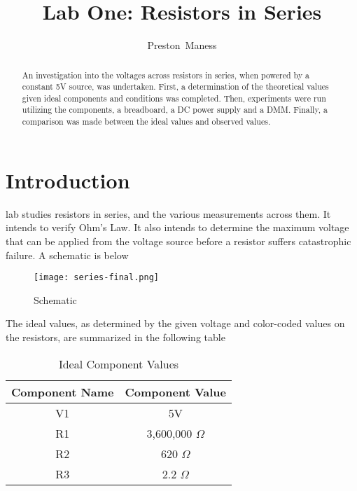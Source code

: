 \documentclass[journal]{IEEEtran}
\begin{document}
\title{Lab One: Resistors in Series}
\author{Preston~Maness}

%
{}

\maketitle

\begin{abstract}
An investigation into the voltages across resistors in series, when powered by a constant 5V source, was undertaken. First, a determination of the theoretical values given ideal components and conditions was completed. Then, experiments were run utilizing the components, a breadboard, a DC power supply and a DMM. Finally, a comparison was made between the ideal values and observed values.
\end{abstract}

\section{Introduction}
 lab studies resistors in series, and the various measurements across them. It intends to verify Ohm's Law. It also intends to determine the maximum voltage that can be applied from the voltage source before a resistor suffers catastrophic failure. A schematic is below

\begin{figure}[h!]
\centering
\texttt{[image: series-final.png]}
\caption{Schematic}
\label{fig_schem}
\end{figure}

The ideal values, as determined by the given voltage and color-coded values on the resistors, are summarized in the following table

\begin{table}[h!]
\renewcommand{\arraystretch}{1.5}
\caption{Ideal Component Values}
\label{table_ideal}
\centering
\begin{tabular}{|c|c|}
\hline
Component Name & Component Value\\
\hline
V1 & 5V\\
\hline
R1 & 3,600,000 $\Omega$\\
\hline
R2 & 620 $\Omega$\\
\hline
R3 & 2.2 $\Omega$\\
\hline
\end{tabular}
\end{table}
\end{document}
